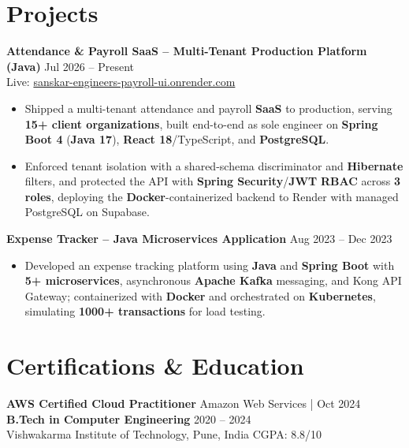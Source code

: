 \documentclass[a4paper,10pt]{article}
\begin{document}
\section*{Projects}

\textbf{Attendance \& Payroll SaaS -- Multi-Tenant Production Platform (Java)} \hfill Jul 2026 -- Present \\
Live: \href{https://sanskar-engineers-payroll-ui.onrender.com/login}{sanskar-engineers-payroll-ui.onrender.com}
\begin{itemize}[leftmargin=*]
    \item Shipped a multi-tenant attendance and payroll \textbf{SaaS} to production, serving \textbf{15+ client organizations}, built end-to-end as sole engineer on \textbf{Spring Boot 4} (\textbf{Java 17}), \textbf{React 18}/TypeScript, and \textbf{PostgreSQL}.
    \item Enforced tenant isolation with a shared-schema discriminator and \textbf{Hibernate} filters, and protected the API with \textbf{Spring Security}/\textbf{JWT} \textbf{RBAC} across \textbf{3 roles}, deploying the \textbf{Docker}-containerized backend to Render with managed PostgreSQL on Supabase.
\end{itemize}

\textbf{Expense Tracker -- Java Microservices Application} \hfill Aug 2023 -- Dec 2023
\begin{itemize}[leftmargin=*]
    \item Developed an expense tracking platform using \textbf{Java} and \textbf{Spring Boot} with \textbf{5+ microservices}, asynchronous \textbf{Apache Kafka} messaging, and Kong API Gateway; containerized with \textbf{Docker} and orchestrated on \textbf{Kubernetes}, simulating \textbf{1000+ transactions} for load testing.
\end{itemize}

\section*{Certifications \& Education}
\textbf{AWS Certified Cloud Practitioner} \hfill Amazon Web Services \;|\; Oct 2024 \\
\textbf{B.Tech in Computer Engineering} \hfill 2020 -- 2024 \\
Vishwakarma Institute of Technology, Pune, India \hfill CGPA: 8.8/10
\end{document}
